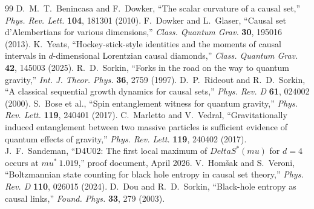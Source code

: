 \documentclass[11pt]{article}
\def\Delta{Delta}%
\def\mu{mu}%
\def\approx{~}%
\begin{document}
\begin{thebibliography}{99}
 D.~M.~T.~Benincasa and F.~Dowker, ``The scalar curvature of a causal set,'' \emph{Phys. Rev. Lett.} \textbf{104}, 181301 (2010).
 F.~Dowker and L.~Glaser, ``Causal set d'Alembertians for various dimensions,'' \emph{Class. Quantum Grav.} \textbf{30}, 195016 (2013).
 K.~Yeats, ``Hockey-stick-style identities and the moments of causal intervals in $d$-dimensional Lorentzian causal diamonds,'' \emph{Class. Quantum Grav.} \textbf{42}, 145003 (2025).
 R.~D.~Sorkin, ``Forks in the road on the way to quantum gravity,'' \emph{Int. J. Theor. Phys.} \textbf{36}, 2759 (1997).
 D.~P.~Rideout and R.~D.~Sorkin, ``A classical sequential growth dynamics for causal sets,'' \emph{Phys. Rev. D} \textbf{61}, 024002 (2000).
 S.~Bose et al., ``Spin entanglement witness for quantum gravity,'' \emph{Phys. Rev. Lett.} \textbf{119}, 240401 (2017).
 C.~Marletto and V.~Vedral, ``Gravitationally induced entanglement between two massive particles is sufficient evidence of quantum effects of gravity,'' \emph{Phys. Rev. Lett.} \textbf{119}, 240402 (2017).
 J.~F.~Sandeman, ``D4U02: The first local maximum of $\Delta S^*(\mu)$ for $d=4$ occurs at $\mu^*\approx 1.019$,'' proof document, April 2026.
 V.~Hom\v{s}ak and S.~Veroni, ``Boltzmannian state counting for black hole entropy in causal set theory,'' \emph{Phys. Rev. D} \textbf{110}, 026015 (2024).
 D.~Dou and R.~D.~Sorkin, ``Black-hole entropy as causal links,'' \emph{Found. Phys.} \textbf{33}, 279 (2003).
\end{thebibliography}
\end{document}
